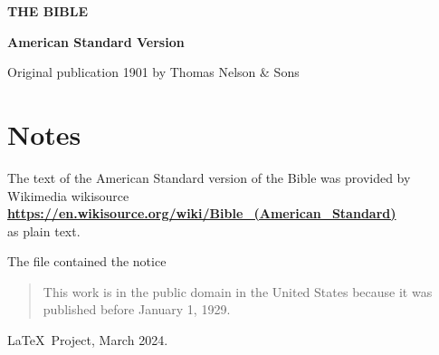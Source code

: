\documentclass[
  twoside,hidelinks
  ]{memoir}
\makeatletter
\let\@starttoc\ori@starttoc
\renewcommand\tableofcontents{%
    \if@twocolumn
      \@restonecoltrue\onecolumn
    \else
      \@restonecolfalse
    \fi
    \chapter*{\contentsname
        \@mkboth{%
           \MakeUppercase\contentsname}{\MakeUppercase\contentsname}}%
    \@starttoc{toc}%
    \if@restonecol\twocolumn\fi
    }
\makeatother
\begin{document}
\frontmatter
\thispagestyle{empty}

\vspace*{1cm}

\begin{center}

{\HUGE\leavevmode{}\textbf{THE BIBLE}}

\vspace{1cm}
{\huge\textbf{American Standard Version}}

\tagstructend

\vspace{2in}

Original publication 1901 by Thomas Nelson \& Sons

\end{center}

\clearpage
\thispagestyle{empty}

\chapter{Notes}

\begingroup
  \setlength\parindent{0pt}
  \setlength\parskip{\bigskipamount}


The text of the American Standard version of the Bible was provided by
Wikimedia wikisource\\
\textbf{\url{https://en.wikisource.org/wiki/Bible_(American_Standard)}}\\
as plain text.

The file contained the notice

\begin{quote}
This work is in the public domain in the United States because it was
published before January 1, 1929.
  
\end{quote}


  
\LaTeX\ Project, March 2024.

\endgroup

\clearpage
\tableofcontents

\mainmatter
\twocolumn


\end{document}
